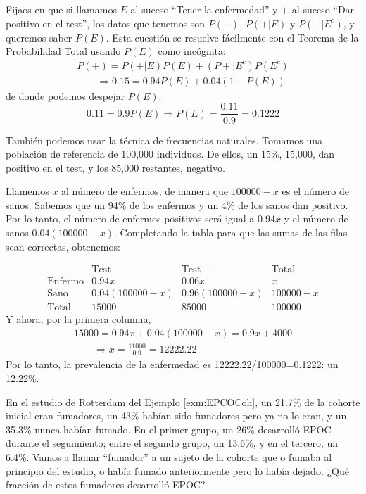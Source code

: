 \documentclass[
]{book}
\theoremstyle{definition}
\theoremstyle{definition}
\theoremstyle{definition}
\theoremstyle{definition}
\theoremstyle{remark}
\begin{document}
Fijaos en que si llamamos \(E\) al suceso ``Tener la enfermedad'' y \(+\) al suceso ``Dar positivo en el test'', los datos que tenemos son \(P(+)\), \(P(+|E)\) y \(P(+|E^c)\), y queremos saber \(P(E)\). Esta cuestión se resuelve fácilmente con el Teorema de la Probabilidad Total usando \(P(E)\) como incógnita:
\[
  \begin{array}{l}
P(+)=P(+|E)P(E)+(P+|E^c)P(E^c) \\
\qquad\Longrightarrow 
0.15 =0.94 P(E)+0.04(1-P(E))
\end{array}
\]
de donde podemos despejar \(P(E)\):
\[
0.11=0.9P(E)\Rightarrow P(E)=\frac{0.11}{0.9}=0.1222
\]

También podemos usar la técnica de frecuencias naturales. Tomamos una población de referencia de 100,000 individuos. De ellos, un 15\%, 15,000, dan positivo en el test, y los 85,000 restantes, negativo.

Llamemos \(x\) al número de enfermos, de manera que \(100000-x\) es el número de sanos. Sabemos que un 94\% de los enfermos y un 4\% de los sanos dan positivo. Por lo tanto, el número de enfermos positivos será igual a \(0.94x\) y el número de sanos \(0.04(100000-x)\). Completando la tabla para que las sumas de las filas sean correctas, obtenemos:

\[
\begin{array}{l|c|c|c}
& \text{Test }+ & \text{Test }- & \text{Total}\\
\hline
\text{Enfermo} & 0.94x  & 0.06x  & x \\ \hline
\text{Sano} & 0.04(100000-x) &  0.96(100000-x) & 100000-x \\\hline
\text{Total} & 15000 &  85000 &   100000
\end{array}
\]
Y ahora, por la primera columna,
\[
\begin{array}{l}
15000=0.94x+0.04(100000-x)=0.9x+4000\\
\qquad\displaystyle \Longrightarrow x=\frac{11000}{0.9}=12222.22
\end{array}
\]
Por lo tanto, la prevalencia de la enfermedad es 12222.22/100000=0.1222: un 12.22\%.

\begin{rmdexercici}
En el estudio de Rotterdam del Ejemplo \ref{exm:EPCOCoh}, un 21.7\% de la cohorte inicial eran fumadores, un 43\% habían sido fumadores pero ya no lo eran, y un 35.3\% nunca habían fumado. En el primer grupo, un 26\% desarrolló EPOC durante el seguimiento; entre el segundo grupo, un 13.6\%, y en el tercero, un 6.4\%. Vamos a llamar ``fumador'' a un sujeto de la cohorte que o fumaba al principio del estudio, o había fumado anteriormente pero lo había dejado. ¿Qué fracción de estos fumadores desarrolló EPOC?
\end{rmdexercici}
\end{document}
